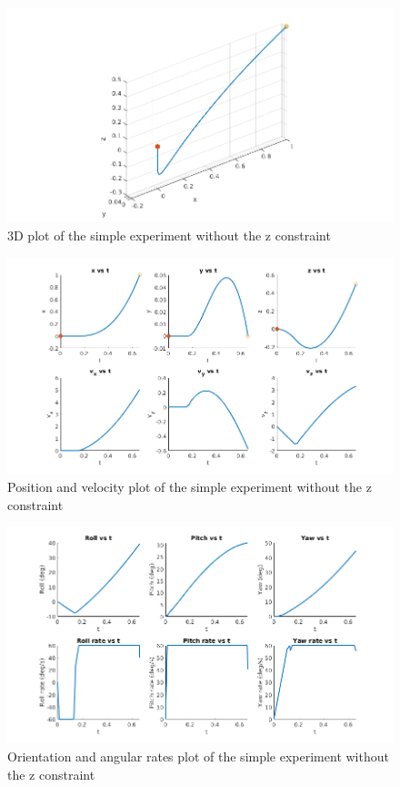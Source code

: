 \documentclass[letterpaper, 10 pt, conference]{ieeeconf}  %
\begin{document}
\begin{figure}[!htpb]
	\centering
	\includegraphics[width=1.0\linewidth]{Images/simple_zfree/3d.png}
	\caption{3D plot of the simple experiment without the z constraint}
	\label{fig:simple_zfree_3d}
\end{figure}
\begin{figure}[!htpb]
	\centering
	\includegraphics[width=1.0\linewidth]{Images/simple_zfree/pos_vel.png}
	\caption{Position and velocity plot of the simple experiment without the z constraint}
	\label{fig:simple_zfree_pos_vel}
\end{figure}
\begin{figure}[!htpb]
	\centering
	\includegraphics[width=1.0\linewidth]{Images/simple_zfree/orient_rates.png}
	\caption{Orientation and angular rates plot of the simple experiment without the z constraint}
	\label{fig:simple_zfree_orient_rates}
\end{figure}
\end{document}
